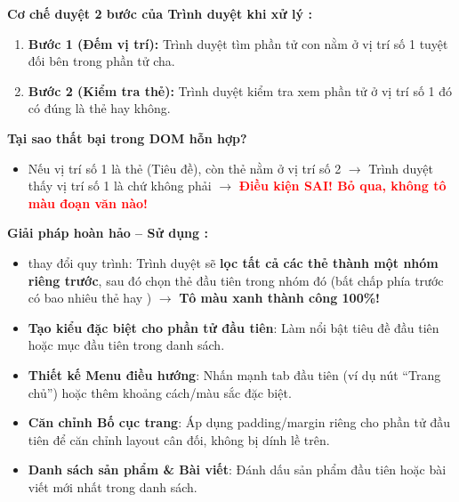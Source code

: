 \begin{warnBox}
\textbf{Cơ chế duyệt 2 bước của Trình duyệt khi xử lý :}
\begin{enumerate}[leftmargin=1.5em, itemsep=2pt, parsep=0pt]
    \item \textbf{Bước 1 (Đếm vị trí):} Trình duyệt tìm phần tử con nằm ở vị trí số 1 tuyệt đối bên trong phần tử cha.
    \item \textbf{Bước 2 (Kiểm tra thẻ):} Trình duyệt kiểm tra xem phần tử ở vị trí số 1 đó có đúng là thẻ  hay không.
\end{enumerate}

\par\vspace{4pt}
\textbf{Tại sao  thất bại trong DOM hỗn hợp?}
\begin{itemize}[leftmargin=1.5em, itemsep=3pt, parsep=0pt]
    \item Nếu vị trí số 1 là thẻ  (Tiêu đề), còn thẻ  nằm ở vị trí số 2 $\rightarrow$ Trình duyệt thấy vị trí số 1 là  chứ không phải  $\rightarrow$ \textcolor{red}{\textbf{Điều kiện SAI! Bỏ qua, không tô màu đoạn văn nào!}}
\end{itemize}

\par\vspace{4pt}
\textbf{Giải pháp hoàn hảo -- Sử dụng :}
\begin{itemize}[leftmargin=1.5em, itemsep=3pt, parsep=0pt]
    \item {} thay đổi quy trình: Trình duyệt sẽ \textbf{lọc tất cả các thẻ  thành một nhóm riêng trước}, sau đó chọn thẻ  đầu tiên trong nhóm đó (bất chấp phía trước có bao nhiêu thẻ  hay ) $\rightarrow$ \textcolor{green!70!black}{\textbf{Tô màu xanh thành công 100\%!}}
\end{itemize}
\end{warnBox}

\begin{conceptBox}
\begin{itemize}[leftmargin=1.5em, itemsep=3pt, parsep=0pt]
    \item \textbf{Tạo kiểu đặc biệt cho phần tử đầu tiên}: Làm nổi bật tiêu đề đầu tiên hoặc mục đầu tiên trong danh sách.
    \item \textbf{Thiết kế Menu điều hướng}: Nhấn mạnh tab đầu tiên (ví dụ nút ``Trang chủ'') hoặc thêm khoảng cách/màu sắc đặc biệt.
    \item \textbf{Căn chỉnh Bố cục trang}: Áp dụng padding/margin riêng cho phần tử đầu tiên để căn chỉnh layout cân đối, không bị dính lề trên.
    \item \textbf{Danh sách sản phẩm \& Bài viết}: Đánh dấu sản phẩm đầu tiên hoặc bài viết mới nhất trong danh sách.
\end{itemize}
\end{conceptBox}

